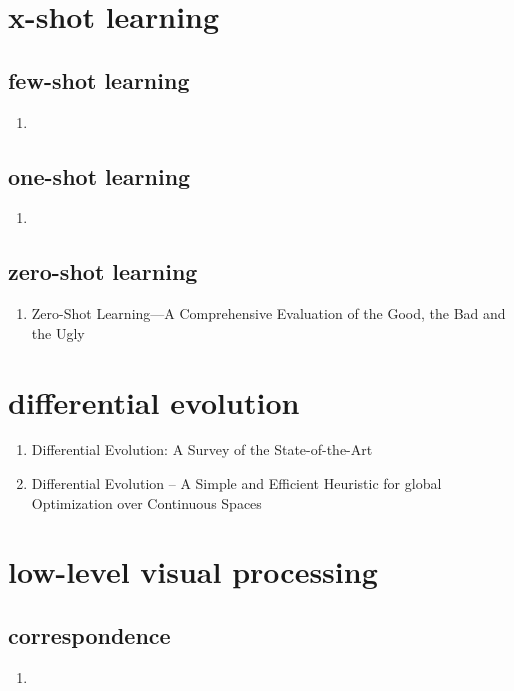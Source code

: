 \documentclass[acmlarge]{acmart}
\begin{document}
\section{x-shot learning}
	\subsection{few-shot learning}
	\begin{enumerate}
		\item
	\end{enumerate}
	\subsection{one-shot learning}
	\begin{enumerate}
		\item
	\end{enumerate}
	\subsection{zero-shot learning}
	\begin{enumerate}
		\item Zero-Shot Learning—A Comprehensive Evaluation of the Good, the Bad and the Ugly \cite{Xian2019ZeroShotLC} 

	\end{enumerate}
\begin{enumerate}
\end{enumerate}
\section{differential evolution}
\begin{enumerate}
	\item Differential Evolution: A Survey of the State-of-the-Art \cite{Das2011DifferentialEA} 

	\item Differential Evolution – A Simple and Efficient Heuristic for global Optimization over Continuous Spaces \cite{Storn1997DifferentialE} 

\end{enumerate}
\section{low-level visual processing}
	\subsection{correspondence}
	\begin{enumerate}
		\item
	\end{enumerate}
\end{document}
